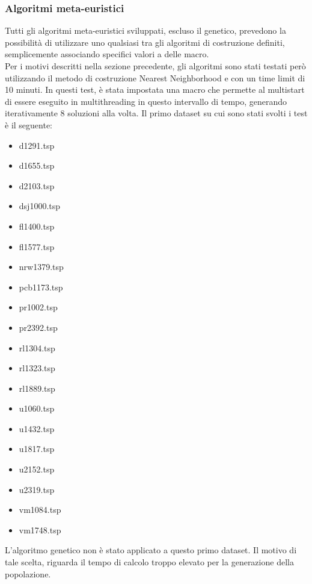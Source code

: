 \subsubsection{Algoritmi meta-euristici}
Tutti gli algoritmi meta-euristici sviluppati, escluso il genetico, prevedono la possibilità di utilizzare uno qualsiasi tra gli algoritmi di costruzione definiti, semplicemente associando specifici valori a delle macro.\\
Per i motivi descritti nella sezione precedente, gli algoritmi sono stati testati però utilizzando il metodo di costruzione Nearest Neighborhood e con un time limit di 10 minuti. In questi test, è stata impostata una macro che permette al multistart di essere eseguito in multithreading in questo intervallo di tempo, generando iterativamente 8 soluzioni alla volta. Il primo dataset su cui sono stati svolti i test è il seguente:
\begin{center}
\begin{multicols}{3}
\begin{itemize}
\item{d1291.tsp}
\item{d1655.tsp} 
\item{d2103.tsp} 
\item{dsj1000.tsp}
\item{fl1400.tsp} 
\item{fl1577.tsp} 
\item{nrw1379.tsp} 
\item{pcb1173.tsp} 
\item{pr1002.tsp}
\item{pr2392.tsp}
\item{rl1304.tsp}
\item{rl1323.tsp}
\item{rl1889.tsp}
\item{u1060.tsp} 
\item{u1432.tsp}
\item{u1817.tsp}
\item{u2152.tsp}
\item{u2319.tsp}
\item{vm1084.tsp}
\item{vm1748.tsp}
\end{itemize}
\end{multicols}
\end{center}
L'algoritmo genetico non è stato applicato a questo primo dataset. Il motivo di tale scelta, riguarda il tempo di calcolo troppo elevato per la generazione della popolazione.\\
